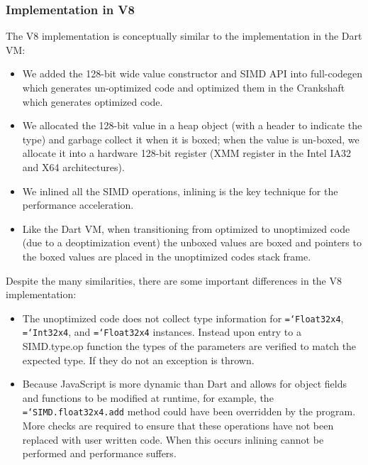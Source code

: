 \documentclass{sigplanconf}
\newcommand{\ttt}[1]{{\texttt{\hyphenchar\font=`\-\relax #1}}}%
\begin{document}
\subsubsection{Implementation in V8}

The V8 implementation is conceptually similar to the implementation in the Dart
VM:

\begin{itemize}
\item
We added the 128-bit wide value constructor and SIMD API into full-codegen which
generates un-optimized code and optimized them in the Crankshaft which generates
optimized code.

\item
We allocated the 128-bit value in a heap object (with a header to indicate the
type) and garbage collect it when it is boxed; when the value is un-boxed, we
allocate it into a hardware 128-bit register (XMM register in the Intel IA32 and
X64 architectures).

\item
We inlined all the SIMD operations, inlining is the key technique for the
performance acceleration.

\item
Like the Dart VM, when transitioning from optimized to unoptimized code (due to
a deoptimization event) the unboxed values are boxed and pointers to the boxed
values are placed in the unoptimized codes stack frame.

\end{itemize}

Despite the many similarities, there are some important differences in the V8
implementation:

\begin{itemize}
\item
The unoptimized code does not collect type information for \ttt{Float32x4},
\ttt{Int32x4}, and \ttt{Float32x4} instances. Instead upon entry to a
SIMD.type.op function the types of the parameters are verified to match the
expected type. If they do not an exception is thrown.

\item
Because JavaScript is more dynamic than Dart and allows for object fields and
functions to be modified at runtime, for example, the \ttt{SIMD.float32x4.add}
method could have been overridden by the program. More checks are required to
ensure that these operations have not been replaced with user written code. When
this occurs inlining cannot be performed and performance suffers.

\end{itemize}
\end{document}
